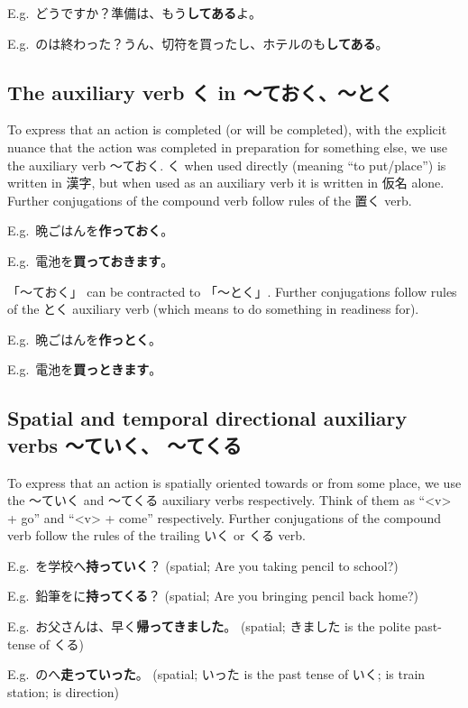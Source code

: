 \documentclass[../nihongo-gakushuu-kyouzai.tex]{subfiles}
\begin{document}
E.g.\ どうですか？準備は、もう\textbf{してある}よ。

E.g.\ のは終わった？うん、切符を買ったし、ホテルのも\textbf{してある}。

\subsection{The auxiliary verb く in 〜ておく、〜とく} \label{sec:auxiliary-verb-teoku}
To express that an action is completed (or will be completed), with the explicit nuance that the action was completed in preparation for something else, we use the auxiliary verb 〜ておく. く when used directly (meaning ``to put/place'') is written in 漢字, but when used as an auxiliary verb it is written in 仮名 alone. Further conjugations of the compound verb follow rules of the 置く verb.

E.g.\ 晩ごはんを\textbf{作っておく}。

E.g.\ 電池を\textbf{買っておきます}。

「〜ておく」 can be contracted to 「〜とく」. Further conjugations follow rules of the とく auxiliary verb (which means to do something in readiness for).

E.g.\ 晩ごはんを\textbf{作っとく}。

E.g.\ 電池を\textbf{買っときます}。

\subsection{Spatial and temporal directional auxiliary verbs 〜ていく、 〜てくる} \label{sec:auxiliary-verbs-teiku-tekiru}
To express that an action is spatially oriented towards or from some place, we use the 〜ていく and 〜てくる auxiliary verbs respectively. Think of them as ``<v> + go'' and ``<v> + come'' respectively. Further conjugations of the compound verb follow the rules of the trailing いく or くる verb.

E.g.\ を学校へ\textbf{持っていく}？ (spatial; Are you taking pencil to school?)

E.g.\ 鉛筆をに\textbf{持ってくる}？ (spatial; Are you bringing pencil back home?)

E.g.\ お父さんは、早く\textbf{帰ってきました}。 (spatial; きました is the polite past-tense of くる)

E.g.\ のへ\textbf{走っていった}。 (spatial; いった is the past tense of いく;  is train station;  is direction)
\end{document}

